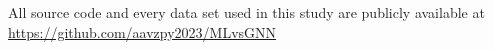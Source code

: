 All source code and every data set used in this study are publicly available at \url{https://github.com/aavzpy2023/MLvsGNN}
    
